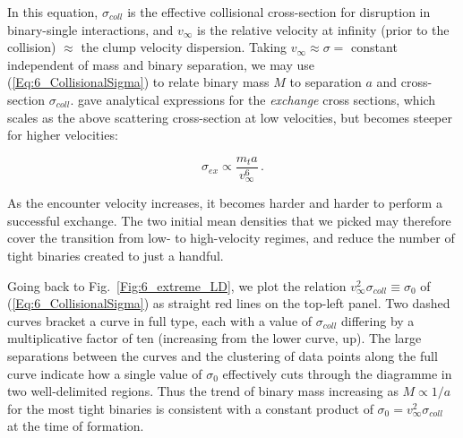 In this equation, $\sigma_{coll}$ is the effective collisional cross-section for disruption in binary-single  interactions, and $v_\infty$ is the relative velocity at infinity (prior to the collision) $\approx $ the clump velocity dispersion. Taking $ v_\infty \approx \sigma = $ constant independent of mass and binary separation, we may use (\ref{Eq:6_CollisionalSigma}) to relate binary mass $M$ to separation $a$ and  cross-section $\sigma_{coll}$. 
\cite{Hut1983,Hut1983b} gave analytical expressions for the \textit{exchange} cross sections, which scales as the above scattering cross-section at low velocities, but becomes steeper for higher velocities:

\begin{equation}
\sigma_{ex} \propto \frac{m_t a}{v_\infty^6}\, . 
\label{Eq:6_ExchangeSigma} 
\end{equation}
  
As the encounter velocity increases, it becomes harder and harder to perform a successful exchange. The two initial mean 
densities that we picked may therefore cover the transition from low- to high-velocity regimes, and reduce the number of tight binaries created to just a handful. 

Going back to Fig.~\ref{Fig:6_extreme_LD}, we plot the relation $v^2_\infty \sigma_{coll} \equiv \sigma_0$ of (\ref{Eq:6_CollisionalSigma}) as straight red lines on the top-left panel. Two dashed curves bracket a curve in full type, each with a value of  $\sigma_{coll}$ differing by a multiplicative factor of ten (increasing from the lower curve, up).  The large separations between the curves and the clustering of data points along the full curve indicate how a single value of $\sigma_0$ effectively cuts through the diagramme in two well-delimited regions.  
Thus the trend of binary mass increasing as $M \propto 1/a$ for the most tight binaries is consistent with a constant product of $\sigma_0 = v^2_\infty \sigma_{coll}$ at the time of formation. 


 

